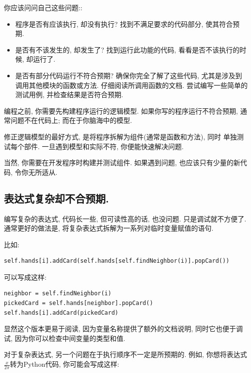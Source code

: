 \documentclass[10pt]{book}
\begin{document}
你应该问问自己这些问题::

\begin{itemize}

\item 程序是否有应该执行, 却没有执行?
找到不满足要求的代码部分, 使其符合预期. 

\item 是否有不该发生的, 却发生了?
找到运行此功能的代码, 看看是否不该执行的时候, 却运行了. 

\item 是否有部分代码运行不符合预期? 
确保你完全了解了这些代码, 尤其是涉及到调用其他模块的函数或方法. 
仔细阅读所调用函数的文档. 
尝试编写一些简单的测试用例, 并检查结果是否符合预期. 
\end{itemize}

编程之前, 你需要先构建程序运行的逻辑模型. 
如果你写的程序运行不符合预期, 
通常问题不在代码上; 而在于你脑海中的模型. 

修正逻辑模型的最好方式, 是将程序拆解为组件(通常是函数和方法), 同时
单独测试每个部件. 
一旦遇到模型和实际不符, 你便能快速解决问题. 

当然, 你需要在开发程序时构建并测试组件. 
如果遇到问题, 也应该只有少量的新代码, 令你无所适从. 


\subsection{表达式复杂却不合预期.}

编写复杂的表达式, 代码长一些, 但可读性高的话, 也没问题.
只是调试就不方便了. 
通常更好的做法是, 将复杂表达式拆解为一系列对临时变量赋值的语句. 

比如:

\begin{verbatim}
self.hands[i].addCard(self.hands[self.findNeighbor(i)].popCard())
\end{verbatim}
%
可以写成这样:

\begin{verbatim}
neighbor = self.findNeighbor(i)
pickedCard = self.hands[neighbor].popCard()
self.hands[i].addCard(pickedCard)
\end{verbatim}
%

显然这个版本更易于阅读, 因为变量名称提供了额外的文档说明, 
同时它也便于调试, 因为你可以检查中间变量的类型和值. 

对于复杂表达式, 另一个问题在于执行顺序不一定是所预期的. 
例如, 你想将表达式$\frac{x}{2 \pi}$转为Python代码, 
你可能会写成这样:
\end{document}

